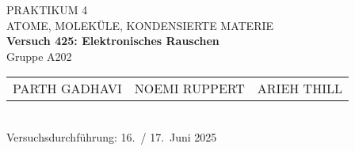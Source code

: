 \documentclass[%
paper=a4,       %
fontsize=11pt,  %
ngerman         %
]{scrreprt}
\begin{document}
\begin{titlepage}
  \centering
  \vspace*{2cm}
  
  {\Large PRAKTIKUM 4}\\[0.5cm]
  {\large ATOME, MOLEKÜLE, KONDENSIERTE MATERIE}\\[1cm]
  
  {\LARGE\bfseries Versuch 425: Elektronisches Rauschen}\\[1cm]
  
  Gruppe A202\\[1cm]
  
  \begin{tabular}{lll}
    PARTH GADHAVI   & NOEMI RUPPERT   & ARIEH THILL \\
  \end{tabular}\\[2cm]
  
  Versuchsdurchführung: 16.~/ 17.~Juni 2025
  
  \vfill
\end{titlepage}

\tableofcontents
\clearpage
\clearpage
\setcounter{page}{1}
 
 
 
 
 
 
 
 
 
 
 

\appendix
\printbibliography{}
\end{document}
